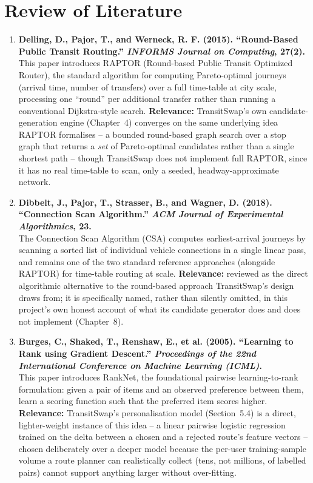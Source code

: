 \documentclass[12pt,a4paper]{report}
\begin{document}
\section{Review of Literature}

\begin{enumerate}[leftmargin=*]

\item \textbf{Delling, D., Pajor, T., and Werneck, R. F. (2015). ``Round-Based Public Transit
Routing.'' \textit{INFORMS Journal on Computing}, 27(2).}\\
This paper introduces RAPTOR (Round-based Public Transit Optimized Router), the standard algorithm
for computing Pareto-optimal journeys (arrival time, number of transfers) over a full time-table at
city scale, processing one ``round'' per additional transfer rather than running a conventional
Dijkstra-style search. \textbf{Relevance:} TransitSwap's own candidate-generation engine (Chapter~4)
converges on the same underlying idea RAPTOR formalises -- a bounded round-based graph search over a
stop graph that returns a \emph{set} of Pareto-optimal candidates rather than a single shortest
path -- though TransitSwap does not implement full RAPTOR, since it has no real time-table to scan,
only a seeded, headway-approximate network.

\item \textbf{Dibbelt, J., Pajor, T., Strasser, B., and Wagner, D. (2018). ``Connection Scan
Algorithm.'' \textit{ACM Journal of Experimental Algorithmics}, 23.}\\
The Connection Scan Algorithm (CSA) computes earliest-arrival journeys by scanning a sorted list of
individual vehicle connections in a single linear pass, and remains one of the two standard
reference approaches (alongside RAPTOR) for time-table routing at scale. \textbf{Relevance:}
reviewed as the direct algorithmic alternative to the round-based approach TransitSwap's design
draws from; it is specifically named, rather than silently omitted, in this project's own honest
account of what its candidate generator does and does not implement (Chapter~8).

\item \textbf{Burges, C., Shaked, T., Renshaw, E., et al. (2005). ``Learning to Rank using
Gradient Descent.'' \textit{Proceedings of the 22nd International Conference on Machine
Learning (ICML)}.}\\
This paper introduces RankNet, the foundational pairwise learning-to-rank formulation: given a pair
of items and an observed preference between them, learn a scoring function such that the preferred
item scores higher. \textbf{Relevance:} TransitSwap's personalisation model (Section~5.4) is a
direct, lighter-weight instance of this idea -- a linear pairwise logistic regression trained on the
delta between a chosen and a rejected route's feature vectors -- chosen deliberately over a deeper
model because the per-user training-sample volume a route planner can realistically collect (tens,
not millions, of labelled pairs) cannot support anything larger without over-fitting.


\end{enumerate}
\end{document}
